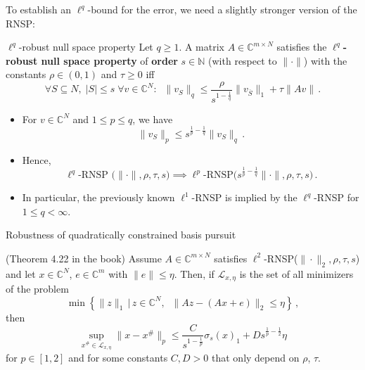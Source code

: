 \documentclass[11pt]{beamer}
\newcommand{\CC}{\mathbb{C}}
\newcommand{\NN}{\mathbb{N}}
\renewcommand{\emph}{\textbf}
\begin{document}
\begin{frame}{}
	To establish an \(\ell^q \)-bound for the error, we need a slightly stronger version of the RNSP:
 \begin{Def}
 {$\ell^q$-robust null space property}{}
 Let \(q\ge 1\). A matrix \(A\in \CC^{m\times N}\) satisfies the \emph{$\ell^q$-robust null space property} of \emph{order} \(s\in \NN\) (with respect to \(\|\cdot\|\)) with the constants \(\rho\in (0,1)\) and \(\tau\ge0\) iff
 \[\forall S\subseteq N,\;|S|\le s\;\forall v\in \CC^N:\;\;\|v_S\|_q\le \frac{\rho}{s^{1-\frac{1}{q}}}\|v_{\overline S}\|_1+\tau\|Av\|\,.\]
 \end{Def}
 \end{frame}

 \begin{frame}
	\begin{itemize}
		\item For \(v\in \CC^N \) and \(1\le p\le q\), we have 
		\[\|v_S\|_p\le s^{\frac{1}{p}-\frac{1}{q}}\|v_S\|_q\,.\]
		\item Hence, 
		\[
		\ell^q
		\text{-RNSP
		($\|\cdot\|,\rho,\tau,s$)}
		\implies \ell^p \text{-RNSP($s^{\frac{1}{p}-\frac{1}{q}}\|\cdot\|,\rho,\tau,s$)}\,.
		\]
		\item In particular, the previously known \(\ell^1\)-RNSP is implied by the \(\ell^q\)-RNSP for \(1\le q<\infty\).
	\end{itemize}
 \end{frame}

 \begin{frame}{Robustness of quadratically constrained basis pursuit}
	\begin{Kor}
		{(Theorem 4.22 in the book)}{}
		Assume \(A\in \CC^{m\times N }\) satisfies \(\ell^2 \)-RNSP($\|\cdot\|_2,\rho,\tau, s$) and let \(x\in \CC^N\), \(e\in \CC^m\) with \(\|e\|\le \eta\). Then, if \(\mathcal L_{x,\eta}\) is the set of all minimizers of the problem
		\[\min\left\{\|z\|_1\,\big|\,z\in \CC^N,\;\;\|Az-(Ax+e)\|_2\le \eta\right\}\,,\]
		then
		\[\sup_{x^{\#}\in \mathcal L_{x,\eta}}\|x-x^{\#}\|_p\le \frac{C}{s^{1-\frac{1}{p}}}\sigma_s(x)_1+Ds^{\frac{1}{p}-\frac{1}{2}}\eta\]
		for \(p\in [1,2]\) and for some constants \(C,D>0\) that only depend on \(\rho\), \(\tau\).
	\end{Kor}
 \end{frame}
\end{document}

